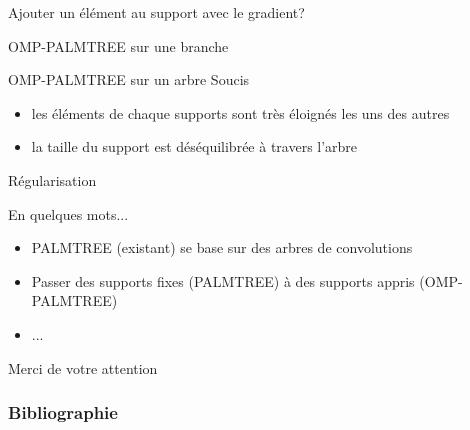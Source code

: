 \begin{frame}{Ajouter un élément au support avec le gradient?}
\end{frame}
\begin{frame}{OMP-PALMTREE sur une branche}
\end{frame}


\begin{frame}{OMP-PALMTREE sur un arbre}
Soucis
\begin{itemize}
	\item les éléments de chaque supports sont très éloignés les uns des autres
	\item la taille du support est déséquilibrée à travers l'arbre
\end{itemize}
\end{frame}


\begin{frame}{Régularisation}
\end{frame}


\begin{frame}{En quelques mots...}
\begin{itemize}
\item PALMTREE (existant) se base sur des arbres de convolutions
\item Passer des supports fixes (PALMTREE) à des supports appris (OMP-PALMTREE)
\item ...
\end{itemize}
\vfill
\hfill Merci de votre attention
\end{frame}

\appendix

\begin{frame}
\frametitle{Bibliographie}
\printbibliography[heading=none]
\end{frame}


